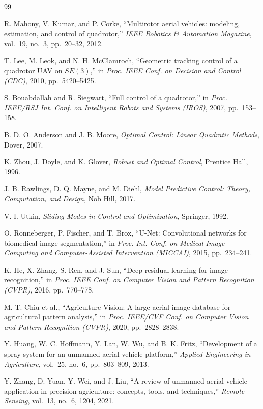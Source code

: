 \documentclass[12pt,a4paper]{article}
\begin{document}
\begin{thebibliography}{99}

R. Mahony, V. Kumar, and P. Corke, ``Multirotor aerial vehicles: modeling, estimation,
and control of quadrotor,'' \emph{IEEE Robotics \& Automation Magazine}, vol.~19,
no.~3, pp.~20--32, 2012.

T. Lee, M. Leok, and N. H. McClamroch, ``Geometric tracking control of a quadrotor UAV
on $SE(3)$,'' in \emph{Proc. IEEE Conf. on Decision and Control (CDC)}, 2010,
pp.~5420--5425.

S. Bouabdallah and R. Siegwart, ``Full control of a quadrotor,'' in \emph{Proc.
IEEE/RSJ Int. Conf. on Intelligent Robots and Systems (IROS)}, 2007, pp.~153--158.

B. D. O. Anderson and J. B. Moore, \emph{Optimal Control: Linear Quadratic Methods},
Dover, 2007.

K. Zhou, J. Doyle, and K. Glover, \emph{Robust and Optimal Control}, Prentice Hall,
1996.

J. B. Rawlings, D. Q. Mayne, and M. Diehl, \emph{Model Predictive Control: Theory,
Computation, and Design}, Nob Hill, 2017.

V. I. Utkin, \emph{Sliding Modes in Control and Optimization}, Springer, 1992.

O. Ronneberger, P. Fischer, and T. Brox, ``U-Net: Convolutional networks for biomedical
image segmentation,'' in \emph{Proc. Int. Conf. on Medical Image Computing and
Computer-Assisted Intervention (MICCAI)}, 2015, pp.~234--241.

K. He, X. Zhang, S. Ren, and J. Sun, ``Deep residual learning for image recognition,''
in \emph{Proc. IEEE Conf. on Computer Vision and Pattern Recognition (CVPR)}, 2016,
pp.~770--778.

M. T. Chiu et al., ``Agriculture-Vision: A large aerial image database for agricultural
pattern analysis,'' in \emph{Proc. IEEE/CVF Conf. on Computer Vision and Pattern
Recognition (CVPR)}, 2020, pp.~2828--2838.

Y. Huang, W. C. Hoffmann, Y. Lan, W. Wu, and B. K. Fritz, ``Development of a spray
system for an unmanned aerial vehicle platform,'' \emph{Applied Engineering in
Agriculture}, vol.~25, no.~6, pp.~803--809, 2013.

Y. Zhang, D. Yuan, Y. Wei, and J. Liu, ``A review of unmanned aerial vehicle application
in precision agriculture: concepts, tools, and techniques,'' \emph{Remote Sensing},
vol.~13, no.~6, 1204, 2021.

\end{thebibliography}
\end{document}
